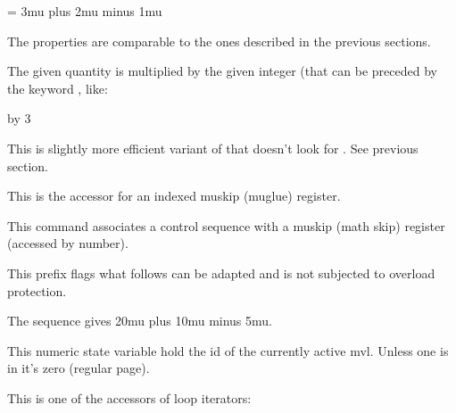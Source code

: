 \starttyping
\mugluespecdef\MyGlue = 3mu plus 2mu minus 1mu
\stoptyping

The properties are comparable to the ones described in the previous sections.

\stopnewprimitive

\startoldprimitive[title={\prm {multiply}}]

The given quantity is multiplied by the given integer (that can be preceded by
the keyword , like:

\starttyping
\scratchdimen=10pt \multiply\scratchdimen by 3
\stoptyping

\stopoldprimitive

\startnewprimitive[title={\prm {multiplyby}}]

This is slightly more efficient variant of  that doesn't look for
. See previous section.

\stopnewprimitive

\startoldprimitive[title={\prm {muskip}}]

This is the accessor for an indexed muskip (muglue) register.

\stopoldprimitive

\startoldprimitive[title={\prm {muskipdef}}]

This command associates a control sequence with a muskip (math skip) register
(accessed by number).

\stopoldprimitive

\startnewprimitive[title={\prm {mutable}}]

This prefix flags what follows can be adapted and is not subjected to overload
protection.

\stopnewprimitive

\startoldprimitive[title={\prm {mutoglue}}]

The sequence  gives \the \mutoglue
20mu plus 10mu minus 5mu.

\stopoldprimitive

\startnewprimitive[title={\prm {mvlcurrentlyactive}}]

This numeric state variable hold the id of the currently active mvl. Unless one
is in  it's zero (regular page).

\stopnewprimitive

\startnewprimitive[title={\prm {nestedloopiterator}}]

This is one of the accessors of loop iterators:

